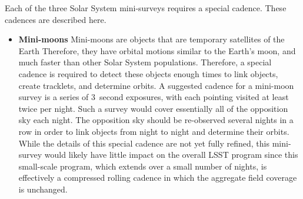 Each of the three Solar System mini-surveys requires a special
cadence. These cadences are described here.

\begin{itemize}

\item{{\bf Mini-moons}}
Mini-moons are objects that are temporary satellites of the Earth
\citep{2014Icar..241..280B, 2017Icar..285...83F}
Therefore, they have orbital motions similar to the Earth's moon,
and much faster than other Solar System populations. Therefore,
a special cadence is required to detect these objects enough
times to link objects, create tracklets, and determine orbits.
A suggested cadence for a mini-moon survey is a series
of 3~second exposures, with each pointing visited at least
twice per night. Such a survey would cover essentially
all of the opposition sky each night. The opposition sky should
be re-observed several nights in a row in order to
link objects from night to night and determine their orbits.
While the details of this special cadence are not yet
fully refined, this mini-survey would likely have little impact
on the overall LSST program since this small-scale
program, which extends over a small number of nights,
is effectively a compressed rolling cadence in which
the aggregate field coverage is unchanged.


\end{itemize}
